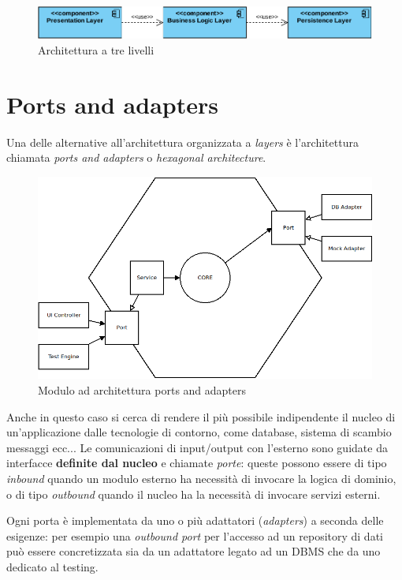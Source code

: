 \begin{figure}[h]
	\centering
	\includegraphics[width=\textwidth]{img/layered-architecture}
	\caption{Architettura a tre livelli}
	\label{fig:layered-architecture}
\end{figure}

\section{Ports and adapters}

Una delle alternative all'architettura organizzata a \textit{layers} è l'architettura chiamata \textit{ports and adapters} o \textit{hexagonal architecture}\cite{microservices_architecture}.

\begin{figure}[h]
	\centering
	\includegraphics[scale=0.5]{img/hexagonal}
	\caption{Modulo ad architettura ports and adapters}
	\label{fig:hexagonal}
\end{figure}

Anche in questo caso si cerca di rendere il più possibile indipendente il nucleo di un'applicazione dalle tecnologie di contorno, come database, sistema di scambio messaggi ecc...
Le comunicazioni di input/output con l'esterno sono guidate da interfacce \textbf{definite dal nucleo} e chiamate \textit{porte}: queste possono essere di tipo \textit{inbound} quando un modulo esterno ha necessità di invocare la logica di dominio, o di tipo \textit{outbound} quando il nucleo ha la necessità di invocare servizi esterni.

Ogni porta è implementata da uno o più adattatori (\textit{adapters}) a seconda delle esigenze: per esempio una \textit{outbound port} per l'accesso ad un repository di dati può essere concretizzata sia da un adattatore legato ad un DBMS che da uno dedicato al testing.

